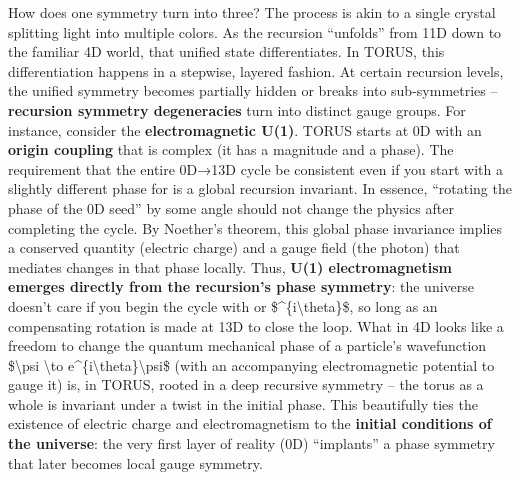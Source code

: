 \documentclass[
]{article}
\begin{document}
How does one symmetry turn into three? The process is akin to a single
crystal splitting light into multiple colors. As the recursion
``unfolds'' from 11D down to the familiar 4D world, that unified state
differentiates. In TORUS, this differentiation happens in a stepwise,
layered fashion. At certain recursion levels, the unified symmetry
becomes partially hidden or breaks into sub-symmetries --
\textbf{recursion symmetry degeneracies} turn into distinct gauge
groups. For instance, consider the \textbf{electromagnetic U(1)}. TORUS
starts at 0D with an \textbf{origin coupling \alpha} that is complex (it has
a magnitude and a phase). The requirement that the entire 0D→13D cycle
be consistent even if you start with a slightly different phase for \alpha is
a global recursion invariant. In essence, ``rotating the phase of the 0D
seed'' by some angle should not change the physics after completing the
cycle\hspace{0pt}. By Noether's theorem, this global phase invariance
implies a conserved quantity (electric charge) and a gauge field (the
photon) that mediates changes in that phase locally. Thus, \textbf{U(1)
electromagnetism emerges directly from the recursion's phase symmetry}:
the universe doesn't care if you begin the cycle with \alpha or
\$\alphae\^{}\{i\textbackslash theta\}\$, so long as an compensating rotation
is made at 13D to close the loop\hspace{0pt}. What in 4D looks like a
freedom to change the quantum mechanical phase of a particle's
wavefunction \$\textbackslash psi \textbackslash to
e\^{}\{i\textbackslash theta\}\textbackslash psi\$ (with an accompanying
electromagnetic potential to gauge it) is, in TORUS, rooted in a deep
recursive symmetry -- the torus as a whole is invariant under a twist in
the initial phase. This beautifully ties the existence of electric
charge and electromagnetism to the \textbf{initial conditions of the
universe}: the very first layer of reality (0D) ``implants'' a phase
symmetry that later becomes local gauge symmetry.
\end{document}
